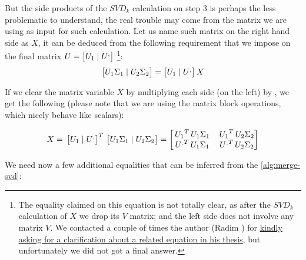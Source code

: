 But the side products of the ${SVD}_k$ calculation on step $3$ is
perhaps the less problematic to understand, the real trouble may come
from the matrix we are using as input for such calculation. Let us
name such matrix on the right hand side as $X$, it can be deduced from
the following requirement that we impose on the final matrix $U
= \begin{bmatrix}U_1 \mid \prim{U}\end{bmatrix}$ \footnote{The
  equality claimed on this 
  equation is not totally clear, as after the $SVD_k$ calculation of
  $X$ we drop its $V$ matrix; and the left side does not involve any
  matrix $V$. We contacted a couple of times the author (Radim
  \Rehurek) for \href{http://math.stackexchange.com/questions/1375029/merging-two-svd-factorizations-but-using-only-u-1s-1-and-u-2s-2-question-ab}{kindly
  asking for a clarification about a related equation in his thesis},
  but unfortunately we did not got a final answer.}: \\

\[
\begin{bmatrix}U_1\Sigma_1 \mid U_2\Sigma_2\end{bmatrix} = 
\begin{bmatrix}U_1 \mid \prim{U}\end{bmatrix} X
\]
\hfill

If we clear the matrix variable $X$ by multiplying each side (on the
left) by , we get
the following (please note that we are using the matrix block
operations, which nicely behave like scalars):

\begin{equation}
\label{eq:svd-merge-x1a}
X = 
\trans{\begin{bmatrix}U_1 \mid \prim{U}\end{bmatrix}} \begin{bmatrix}U_1\Sigma_1 \mid U_2\Sigma_2\end{bmatrix} =
\begin{bmatrix}
\trans{U_1}U_1\Sigma_1 & \trans{U_1}U_2\Sigma_2 \\
\trans{\prim{U}}U_1\Sigma_1 & \trans{\prim{U}}U_2\Sigma_2
\end{bmatrix}
\end{equation}
\hfill

We need now a few additional equalities that can be inferred from the
\cref{alg:merge-svd}: \\

